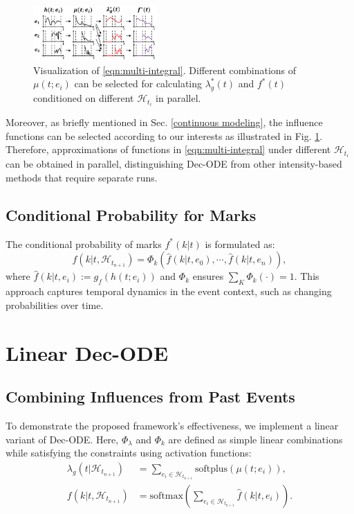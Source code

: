 \begin{figure}
    \includegraphics[width=0.42\textwidth]{figure/eq_9_figure2.png}
    \captionsetup[figure]{font=small}
    \caption{\small Visualization of \eqref{eqn:multi-integral}. Different combinations of $\mu(t;e_i)$ can be selected for calculating $\lambda ^*_g(t)$ and $f^*(t)$ conditioned on different $\mathcal{H}_{t_i}$ in parallel.}
    \label{fig: selective DE}
\end{figure} 
Moreover, as briefly mentioned in Sec. \ref{continuous modeling}, the influence functions can be selected according to our interests as illustrated in Fig. \ref{fig: selective DE}. 
Therefore, approximations of functions in \eqref{eqn:multi-integral} under different $\mathcal{H}_{t_i}$ can be obtained in parallel, distinguishing Dec-ODE from other intensity-based methods that require separate runs. 


\subsection{Conditional Probability for Marks \label{sec:fk}}

The conditional probability of marks $f^*(k|t)$ is formulated as:
\begin{equation}
 f(k|t, \mathcal{H}_{t_{n+1}}) = \Phi_k(\hat{f}(k|t,e_0), \cdots, \hat{f}(k|t,e_n)),
\end{equation}
where $\hat{f}(k|t,e_i):= g_f(h(t;e_i))$ and $\Phi_k$ ensures $\sum_K \Phi_k(\cdot) = 1$. This approach captures temporal dynamics in the event context, such as changing probabilities over time.

\section{Linear Dec-ODE}
\subsection{Combining Influences from Past Events}
To demonstrate the proposed framework's effectiveness, we implement a linear variant of Dec-ODE. Here, $\Phi_\lambda$ and $\Phi_k$ are defined as simple linear combinations while satisfying the constraints using activation functions:
\begin{align}
\lambda_g(t|\mathcal{H}_{t_{n+1}}) &= \sum_{e_i \in \mathcal{H}_{t_{n+1}}} \text{softplus}(\mu(t;e_i)), \label{eq: lin-ground}\\
f(k|t, \mathcal{H}_{t_{n+1}}) &= \text{softmax}\left(\sum_{e_i \in \mathcal{H}_{t_{n+1}}} \hat{f}(k|t,e_i)\right).
\end{align}

